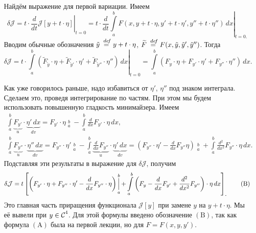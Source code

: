 \documentclass[12pt,a4paper,openany,fleqn]{book}
\newcommand {\defeq}{\stackrel{\hspace{0.09 cm}de\!f}{=}}
\newcommand {\eqdef}{\defeq}
\newcommand{\Cf}{\ensuremath{\mathcal{C}}}
\newcommand{\J}{\ensuremath{\mathcal{J}}}
\newcommand{\Cfn}[2][]{\ensuremath{\Cf{\mathstrut}^{#2}_{#1}}}
\newcommand{\der}[2]{\ensuremath{\frac{d#1}{d#2}}}
\newcommand{\dder}[2]{\ensuremath{\frac{d^2#1}{d#2^2}}}
\theoremstyle{definition}
\begin{document}
	Найдём выражение для первой вариации. Имеем
	\begin{equation*}
	\delta\J=t\cdot\left.\der{}{t}\J[y+t\cdot\eta]\right|_{t=0}=t\cdot\left.\der{}{t}\int\limits_a^b F(x,y+t\cdot\eta,y'+t\cdot\eta',y''+t\cdot\eta'')\,dx\right|_{t=0\displaystyle.}
	\end{equation*}
	Вводим обычные обозначения $\tilde{y}\eqdef y+t\cdot\eta$, $\widetilde{F}\eqdef F(x,\tilde{y},\tilde{y}',\tilde{y}'')$. Тогда 
	\begin{equation*}
		\delta\J=t\cdot\left.\int\limits_a^b\left( \widetilde{F}_{\tilde{y}}\cdot\eta+\widetilde{F}_{\tilde{y}'}\cdot\eta'+\widetilde{F}_{\tilde{y}''}\cdot\eta''\right)\,dx\right|_{t=0}=\int\limits_a^b \left(F_{y}\cdot\eta+F_{y'}\cdot\eta'+F_{y''}\cdot\eta''\right)\,dx.
	\end{equation*}
	
	Как уже говорилось раньше, надо избавиться от $\eta'$, $\eta''$ под знаком интеграла. Сделаем это, проведя интегрирование по частям. При этом мы будем использовать повышенную гладкость минимайзера. Имеем
	\begin{gather*}
		\int\limits_a^b \underbrace{F_{y'}}_{u}\cdot\underbrace{\eta'\,dx}_{dv}=F_{y'}\cdot\eta\mathop{\Big|}\limits_a^b-\int\limits_a^b\der{}{x}F_{y'}\cdot\eta\,dx,\\
		\int\limits_a^b \underbrace{F_{y''}}_{u}\cdot\underbrace{\eta''\,dx}_{dv}=F_{y''}\cdot\eta'\mathop{\Big|}\limits_a^b-\int\limits_a^b\underbrace{\der{}{x}F_{y''}}_{u}\cdot\underbrace{\eta'\,dx}_{dv}=\left(F_{y''}\cdot\eta'-\der{}{x}F_{y''}\eta\right)\mathop{\Big|}\limits_a^b+\int\limits_a^b\dder{}{x}F_{y''}\cdot\eta\,dx.
	\end{gather*}
	Подставляя эти результаты в выражение для $\delta\J$, получим 
	\begin{equation}
		\label{l3:eq:B}
		\hfill\delta\J=t\left[\left(F_{y'}\cdot\eta+F_{y''}\cdot\eta'-\der{}{x}F_{y''}\cdot\eta\right)\mathop{\Big|}\limits_a^b+\int\limits_a^b\left(F_{y}-\der{}{x}F_{y'}+\dder{}{x}F_{y''}\right)\cdot\eta\,dx\right]_{\displaystyle.}\tag{B}\hfill
	\end{equation}
	Это главная часть приращения функционала $\J[y]$ при замене $y$ на $y+t\cdot\eta$. Мы её вывели при $y\in\Cfn{4}$. Для этой формулы введено обозначение $(\text{B})$, так как формула $(\text{A})$ была на первой лекции, но для $F=F(x,y,y')$. 
	
\end{document}
